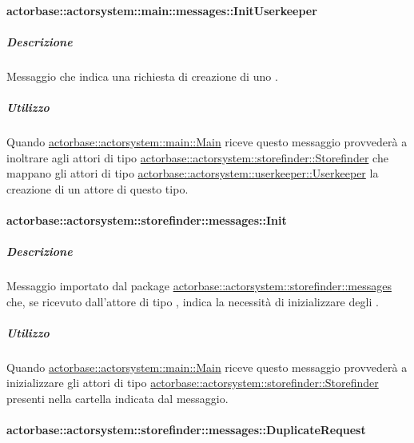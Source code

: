 \documentclass{scalatekids-article}
\begin{document}
\paragraph{actorbase::actorsystem::main::messages::InitUserkeeper}
\label{sec:actorbase::actorsystem::main::messages::InitUserkeeper}

\subparagraph{Descrizione}

Messaggio che indica una richiesta di creazione di uno .

\subparagraph{Utilizzo}

Quando \hyperref[sec:actorbase::actorsystem::main::Main]{actorbase::actorsystem::main::Main}
riceve questo messaggio provvederà a inoltrare agli attori di tipo
\hyperref[sec:actorbase::actorsystem::storefinder::Storefinder]{actorbase::actorsystem::\allowbreak{}storefinder::\allowbreak{}Storefinder}
che mappano gli attori di tipo \hyperref[sec:actorbase::actorsystem::storefinder::Storefinder]{actorbase::actorsystem::\allowbreak{}userkeeper::\allowbreak{}Userkeeper}
la creazione di un attore di questo tipo.

\paragraph{actorbase::actorsystem::storefinder::messages::Init}
\label{sec:actorbase::actorsystem::storefinder::messages::Init}

\subparagraph{Descrizione}

Messaggio importato dal package \hyperref[sec:actorbase::actorsystem::storefinder::messages]{actorbase::\allowbreak{}actorsystem::\allowbreak{}storefinder::\allowbreak{}messages}
che, se ricevuto dall'attore di tipo ,
indica la necessità di inizializzare degli .

\subparagraph{Utilizzo}

Quando \hyperref[sec:actorbase::actorsystem::main::Main]{actorbase::\allowbreak{}actorsystem::\allowbreak{}main::\allowbreak{}Main}
riceve questo messaggio provvederà a inizializzare gli attori di tipo
\hyperref[sec:actorbase::actorsystem::storefinder::Storefinder]{actorbase::\allowbreak{}actorsystem::\allowbreak{}storefinder::\allowbreak{}Storefinder}
presenti nella cartella indicata dal messaggio.

\paragraph{actorbase::actorsystem::storefinder::messages::DuplicateRequest}
\label{sec:actorbase::actorsystem::storefinder::messages::DuplicateRequest}
\end{document}
